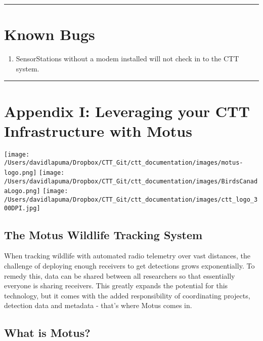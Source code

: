 \documentclass[
]{article}
\providecommand{\tightlist}{%
  \setlength{\itemsep}{0pt}\setlength{\parskip}{0pt}}
\begin{document}
\begin{center}\rule{0.5\linewidth}{0.5pt}\end{center}

\hypertarget{known-bugs}{%
\section{Known Bugs}\label{known-bugs}}

\begin{enumerate}
\def\labelenumi{\arabic{enumi}.}
\tightlist
\item
  SensorStations without a modem installed will not check in to the CTT
  system.
\end{enumerate}

\begin{center}\rule{0.5\linewidth}{0.5pt}\end{center}

\hypertarget{appendix_1}{%
\section{Appendix I: Leveraging your CTT Infrastructure with
Motus}\label{appendix_1}}

\texttt{[image: /Users/davidlapuma/Dropbox/CTT\_Git/ctt\_documentation/images/motus-logo.png]}
\texttt{[image: /Users/davidlapuma/Dropbox/CTT\_Git/ctt\_documentation/images/BirdsCanadaLogo.png]}
\texttt{[image: /Users/davidlapuma/Dropbox/CTT\_Git/ctt\_documentation/images/ctt\_logo\_300DPI.jpg]}

\hypertarget{the-motus-wildlife-tracking-system}{%
\subsection{The Motus Wildlife Tracking
System}\label{the-motus-wildlife-tracking-system}}

When tracking wildlife with automated radio telemetry over vast
distances, the challenge of deploying enough receivers to get detections
grows exponentially. To remedy this, data can be shared between all
researchers so that essentially everyone is sharing receivers. This
greatly expands the potential for this technology, but it comes with the
added responsibility of coordinating projects, detection data and
metadata - that's where Motus comes in.

\hypertarget{what-is-motus}{%
\subsection{What is Motus?}\label{what-is-motus}}
\end{document}
